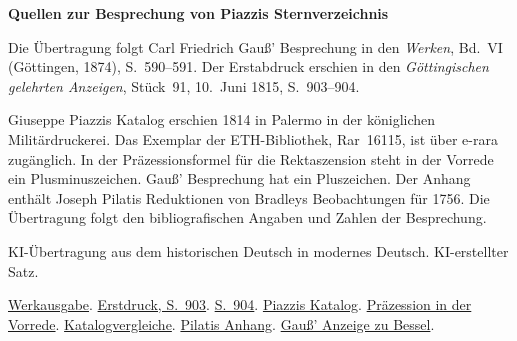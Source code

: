 \clearpage\thispagestyle{empty}
\begin{center}\Large\bfseries Quellen zur Besprechung von Piazzis Sternverzeichnis\end{center}

Die Übertragung folgt Carl Friedrich Gauß’ Besprechung in den \emph{Werken}, Bd.~VI (Göttingen, 1874), S.~590--591. Der Erstabdruck erschien in den \emph{Göttingischen gelehrten Anzeigen}, Stück~91, 10.~Juni 1815, S.~903--904.

Giuseppe Piazzis Katalog erschien 1814 in Palermo in der königlichen Militärdruckerei. Das Exemplar der ETH-Bibliothek, Rar~16115, ist über e-rara zugänglich. In der Präzessionsformel für die Rektaszension steht in der Vorrede ein Plusminuszeichen. Gauß’ Besprechung hat ein Pluszeichen. Der Anhang enthält Joseph Pilatis Reduktionen von Bradleys Beobachtungen für 1756. Die Übertragung folgt den bibliografischen Angaben und Zahlen der Besprechung.

KI-Übertragung aus dem historischen Deutsch in modernes Deutsch. KI-erstellter Satz.

\href{https://gdz.sub.uni-goettingen.de/id/PPN236007467}{Werkausgabe}. \href{https://images.p.sub.uni-goettingen.de/iiif/image/gdz:PPN319721507_1815:00000909/full/1650,/0/default.jpg}{Erstdruck, S.~903}. \href{https://images.p.sub.uni-goettingen.de/iiif/image/gdz:PPN319721507_1815:00000910/full/1650,/0/default.jpg}{S.~904}. \href{https://doi.org/10.3931/e-rara-49143}{Piazzis Katalog}. \href{https://www.e-rara.ch/zut/content/zoom/13476308}{Präzession in der Vorrede}. \href{https://www.e-rara.ch/zut/content/zoom/13476311}{Katalogvergleiche}. \href{https://www.e-rara.ch/zut/content/zoom/13476490}{Pilatis Anhang}. \href{https://images.p.sub.uni-goettingen.de/iiif/image/gdz:PPN319721507_1814:00000190/full/1650,/0/default.jpg}{Gauß’ Anzeige zu Bessel}.

\clearpage
